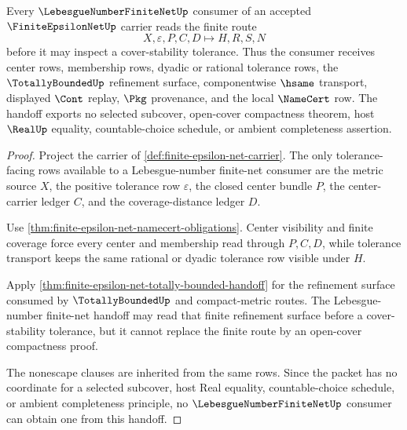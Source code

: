 \begin{theorem}
\label{thm:finite-epsilon-net-lebesgue-number-handoff}
Every $\LebesgueNumberFiniteNetUp$ consumer of an accepted $\FiniteEpsilonNetUp$ carrier reads the finite route
$$
X,\varepsilon,P,C,D \longmapsto H,R,S,N
$$
before it may inspect a cover-stability tolerance. Thus the consumer receives center rows, membership rows, dyadic or rational tolerance rows, the $\TotallyBoundedUp$ refinement surface, componentwise $\hsame$ transport, displayed $\Cont$ replay, $\Pkg$ provenance, and the local $\NameCert$ row. The handoff exports no selected subcover, open-cover compactness theorem, host $\RealUp$ equality, countable-choice schedule, or ambient completeness assertion.
\end{theorem}
\begin{proof}
Project the carrier of \autoref{def:finite-epsilon-net-carrier}. The only tolerance-facing rows available to a Lebesgue-number finite-net consumer are the metric source $X$, the positive tolerance row $\varepsilon$, the closed center bundle $P$, the center-carrier ledger $C$, and the coverage-distance ledger $D$.

Use \autoref{thm:finite-epsilon-net-namecert-obligations}. Center visibility and finite coverage force every center and membership read through $P,C,D$, while tolerance transport keeps the same rational or dyadic tolerance row visible under $H$.

Apply \autoref{thm:finite-epsilon-net-totally-bounded-handoff} for the refinement surface consumed by $\TotallyBoundedUp$ and compact-metric routes. The Lebesgue-number finite-net handoff may read that finite refinement surface before a cover-stability tolerance, but it cannot replace the finite route by an open-cover compactness proof.

The nonescape clauses are inherited from the same rows. Since the packet has no coordinate for a selected subcover, host Real equality, countable-choice schedule, or ambient completeness principle, no $\LebesgueNumberFiniteNetUp$ consumer can obtain one from this handoff.
\end{proof}



